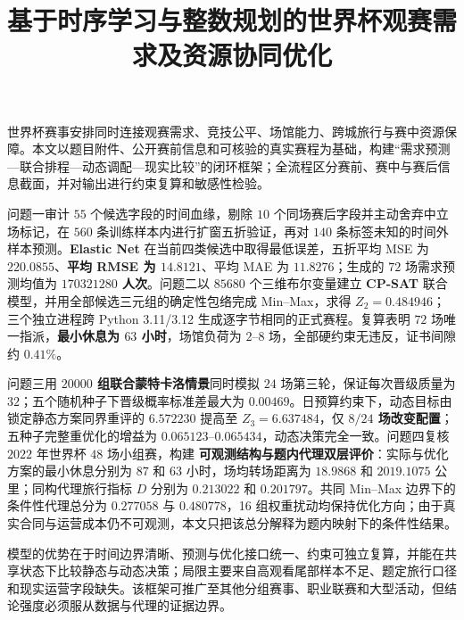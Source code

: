 \documentclass[withoutpreface,bwprint]{cumcmthesis}
\title{基于时序学习与整数规划的世界杯观赛需求及资源协同优化}
\makeatletter
\renewenvironment{abstract}{%
  \if@twocolumn\section*{\abstractname}%
  \else\begin{center}{\zihao{4}\bfseries \abstractname\vspace{-.5em}\vspace{\z@}}\end{center}\quotation
  \fi}{\if@twocolumn\else\endquotation\newpage\fi}
\makeatother
\begin{document}
\maketitle

\begin{abstract}

世界杯赛事安排同时连接观赛需求、竞技公平、场馆能力、跨城旅行与赛中资源保障。本文以题目附件、公开赛前信息和可核验的真实赛程为基础，构建“需求预测—联合排程—动态调配—现实比较”的闭环框架；全流程区分赛前、赛中与赛后信息截面，并对输出进行约束复算和敏感性检验。

问题一审计 $55$ 个候选字段的时间血缘，剔除 $10$ 个同场赛后字段并主动舍弃中立场标记，在 $560$ 条训练样本内进行扩窗五折验证，再对 $140$ 条标签未知的时间外样本预测。\textbf{Elastic Net} 在当前四类候选中取得最低误差，五折平均 MSE 为 $220.0855$、\textbf{平均 RMSE 为 $14.8121$}、平均 MAE 为 $11.8276$；生成的 $72$ 场需求预测均值为 \textbf{$170321280$ 人次}。问题二以 $85680$ 个三维布尔变量建立 \textbf{CP-SAT} 联合模型，并用全部候选三元组的确定性包络完成 Min--Max，求得 \textbf{$Z_2=0.484946$}；三个独立进程跨 Python 3.11/3.12 生成逐字节相同的正式赛程。复算表明 $72$ 场唯一指派，\textbf{最小休息为 $63$ 小时}，场馆负荷为 $2$--$8$ 场，全部硬约束无违反，证书间隙约 $0.41\%$。

问题三用 \textbf{$20000$ 组联合蒙特卡洛情景}同时模拟 $24$ 场第三轮，保证每次晋级质量为 $32$；五个随机种子下晋级概率标准差最大为 $0.00469$。日预算约束下，动态目标由锁定静态方案同界重评的 $6.572230$ 提高至 \textbf{$Z_3=6.637484$}，仅 \textbf{$8/24$ 场改变配置}；五种子完整重优化的增益为 $0.065123$--$0.065434$，动态决策完全一致。问题四复核 $2022$ 年世界杯 $48$ 场小组赛，构建 \textbf{可观测结构与题内代理双层评价}：实际与优化方案的最小休息分别为 $87$ 和 $63$ 小时，场均转场距离为 $18.9868$ 和 $2019.1075$ 公里；同构代理旅行指标 $D$ 分别为 $0.213022$ 和 $0.201797$。共同 Min--Max 边界下的条件性代理总分为 $0.277058$ 与 $0.480778$，16 组权重扰动均保持优化方向；由于真实合同与运营成本仍不可观测，本文只把该总分解释为题内映射下的条件性结果。

模型的优势在于时间边界清晰、预测与优化接口统一、约束可独立复算，并能在共享状态下比较静态与动态决策；局限主要来自高观看尾部样本不足、题定旅行口径和现实运营字段缺失。该框架可推广至其他分组赛事、职业联赛和大型活动，但结论强度必须服从数据与代理的证据边界。

\end{abstract}
\end{document}
